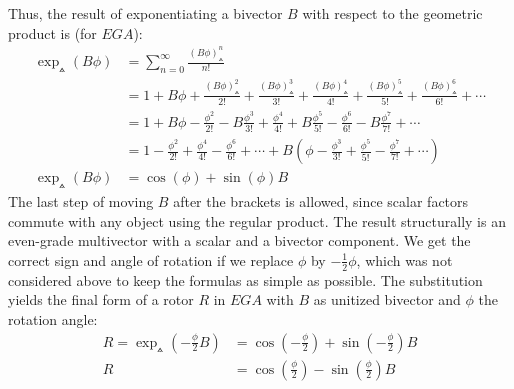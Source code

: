 Thus, the result of exponentiating a bivector $B$ with respect to the geometric product is
(for $EGA$):
\begin{align}
\exp_\wedgedot(B\phi) &= \sum_{n=0}^{\infty} \frac{(B\phi)^n_\wedgedot}{n!} \nonumber \\ 
&= 1 + B\phi + \frac{(B\phi)^2_\wedgedot}{2!} + \frac{(B\phi)^3_\wedgedot}{3!} +
\frac{(B\phi)^4_\wedgedot}{4!} + \frac{(B\phi)^5_\wedgedot}{5!} +
\frac{(B\phi)^6_\wedgedot}{6!} + 
\cdots \\
&= 1 + B\phi - \frac{\phi^2}{2!} - B\frac{\phi^3}{3!} + \frac{\phi^4}{4!} +
   B\frac{\phi^5}{5!} - \frac{\phi^6}{6!} - B\frac{\phi^7}{7!} + \cdots
   \nonumber \\
&= 1 - \frac{\phi^2}{2!} + \frac{\phi^4}{4!} - \frac{\phi^6}{6!} + \cdots
   + B (\phi - \frac{\phi^3}{3!} + \frac{\phi^5}{5!} - \frac{\phi^7}{7!} +
   \cdots)  \nonumber \\[10pt]
\exp_\wedgedot(B\phi) &= \cos(\phi) + \sin(\phi) B
\label{eq:exp_B}
\end{align}
The last step of moving $B$ after the brackets is allowed, since scalar factors commute
with any object using the regular product. The result structurally is an even-grade
multivector with a scalar and a bivector component. We get the correct sign and angle of
rotation if we replace $\phi$ by $-\frac{1}{2}\phi$, which was not considered above to
keep the formulas as simple as possible. The substitution yields the final form of a rotor
$R$ in $EGA$ with $B$ as unitized bivector and $\phi$ the rotation angle:
\begin{align}
    R = \exp_\wedgedot(-\frac{\phi}{2}B)
      &= \cos(-\frac{\phi}{2}) + \sin(-\frac{\phi}{2}) B \nonumber \\
    R &= \cos(\frac{\phi}{2}) - \sin(\frac{\phi}{2}) B 
    \label{eq:rotor_ega}
\end{align}

